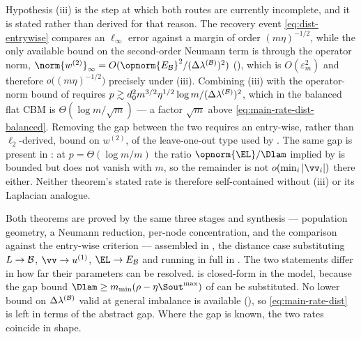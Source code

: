 \begin{remark}\label{rem:dist-remainder}
Hypothesis (iii) is the step at which both routes are currently incomplete, and it
is stated rather than derived for that reason. The recovery event
\eqref{eq:dist-entrywise} compares an $\ell_\infty$ error against a margin of
order $(m\eta)^{-1/2}$, while the only available bound on the second-order
Neumann term is through the operator norm,
$\norm{w^{(2)}}_\infty=O(\opnorm{E_{\Bop}}^2/(\DlamB)^2)$
(), which is $O(\varepsilon_m^2)$ and therefore
$o\bigl((m\eta)^{-1/2}\bigr)$ precisely under (iii). Combining (iii) with the
operator-norm bound of  requires
$p\gtrsim d_0^2m^{3/2}\eta^{1/2}\log m/(\Delta\lambda^{(\mathcal{B})})^2$, which in the balanced flat CBM
is $\Theta(\log m/\sqrt m)$ --- a factor $\sqrt m$ above
\eqref{eq:main-rate-dist-balanced}. Removing the gap between the two requires an
entry-wise, rather than $\ell_2$-derived, bound on $w^{(2)}$, of the
leave-one-out type used by \cite{abbe2020entrywise}. The same gap is present in
: at $p=\Theta(\log m/m)$ the ratio
$\opnorm{\EL}/\Dlam$ implied by  is bounded but does
not vanish with $m$, so the remainder is not $o(\min_i|\vv_i|)$ there either.
Neither theorem's stated rate is therefore self-contained without (iii) or its
Laplacian analogue.
\end{remark}

\noindent Both theorems are proved by the same three stages and synthesis ---
population geometry, a Neumann reduction, per-node concentration, and the
comparison against the entry-wise criterion --- assembled in ,
the distance case
substituting $L\to\mathcal{B}$, $\vv\to\uone$, $\EL\to E_{\Bop}$ and running in full in
. The two statements differ in how far
their parameters can be resolved.  is closed-form in the
model, because the gap bound $\Dlam\ge m_{\min}(\rho-\eta\Sout^{\max})$ of
 can be substituted. No lower bound on $\Delta\lambda^{(\mathcal{B})}$ valid at general
imbalance is available (), so \eqref{eq:main-rate-dist}
is left in terms of the abstract gap. Where the gap is known, the two rates
coincide in shape.

